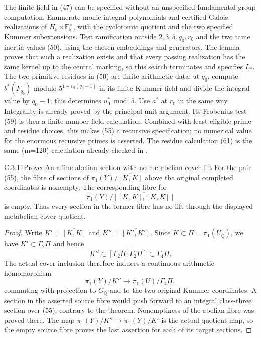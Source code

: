 The finite field in (47) can be specified without
an unspecified fundamental-group computation. Enumerate
monic integral polynomials and certified Galois
realizations of \(H_5\rtimes\mathbb F_5^\times\),
with the cyclotomic quotient and the two specified
Kummer subextensions. Test ramification outside
\(2,3,5,q_0,r_0\) and the two tame inertia values
(50), using the chosen embeddings and generators.
The lemma proves that such a realization exists and
that every passing realization has the same kernel
up to the central marking, so this search terminates
and specifies \(L_*\). The two primitive residues
in (50) are finite arithmetic data: at \(q_0\),
compute \(b^*(F_{q_0})\) modulo
\(5^{1+v_5(q_0-1)}\) in its finite Kummer field
and divide the integral value by \(q_0-1\);
this determines \(u_0^*\bmod5\). Use \(a^*\)
at \(r_0\) in the same way. Integrality is
already proved by the principal-unit argument.
Its Frobenius test (59) is
then a finite number-field calculation. Combined
with least eligible prime and residue choices,
this makes (55) a recursive specification; no
numerical value for the enormous recursive primes
is asserted. The residue calculation (61) is the
same (m=120) calculation already checked in
.

\begin{result}{C.3.11}{Proved}{An affine abelian section with no metabelian cover lift}
\label{cor:ghost-metabelian-cover-exclusion}
For the pair (55), the fibre of sections of
\(\pi_1(Y)/\overline{[K,K]}\) above the original
completed coordinates is nonempty. The corresponding
fibre for
\[
 \pi_1(Y)/\overline{[[K,K],[K,K]]}
                                                        \tag{62}
\]
is empty. Thus every section in the former fibre
has no lift through the displayed metabelian
cover quotient.
\end{result}
\begin{proof}
Write \(K'=\overline{[K,K]}\) and
\(K''=\overline{[K',K']}\). Since
\(K\subset\Pi=\pi_1(U_{\overline{\mathbb Q}})\),
we have \(K'\subset\Gamma_2\Pi\) and hence
\[
 K''\subset\overline{[\Gamma_2\Pi,\Gamma_2\Pi]}
                     \subset\Gamma_4\Pi.
\]
The actual cover inclusion therefore induces a
continuous arithmetic homomorphism
\[
 \pi_1(Y)/K''\longrightarrow\pi_1(U)/\Gamma_4\Pi,
                                                        \tag{63}
\]
commuting with projection to \(G_{\mathbb Q}\)
and to the two original Kummer coordinates.
A section in the asserted source fibre would push
forward to an integral class-three section over
(55), contrary to the theorem. Nonemptiness of
the abelian fibre was proved there. The map
\(\pi_1(Y)/K''\to\pi_1(Y)/K'\) is the actual
quotient map, so the empty source fibre proves
the last assertion for each of its target sections.
\end{proof}

